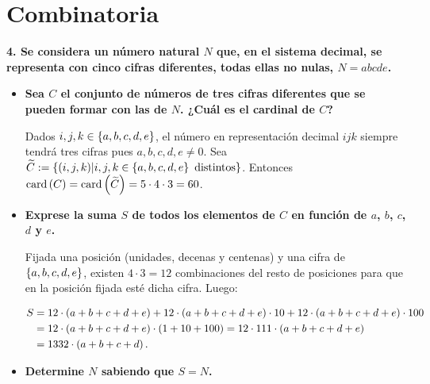 \chapter{Combinatoria}

\textbf{4. Se considera un número natural $N$ que, en el sistema decimal, se representa con cinco cifras diferentes, todas ellas no nulas, $N=abcde$.}

  \begin{itemize}
    \item[\textbf{(1)}] \textbf{Sea $C$ el conjunto de números de tres cifras diferentes que se pueden formar con las de $N$. ¿Cuál es el cardinal de $C$?}
    

    Dados $i,j,k\in\left\{a,b,c,d,e\right\}$, el número en representación decimal $ijk$ siempre tendrá tres cifras pues $a,b,c,d,e\neq 0$. Sea $\widetilde{C}:=\left\{\left(i,j,k\right)\middle|i,j,k\in\left\{a,b,c,d,e\right\}\text{ distintos}\right\}$. Entonces $\text{card}\left(C\right)=\text{card}\left(\widetilde{C}\right)=5\cdot 4\cdot 3=60$.

    \item[\textbf{(2)}] \textbf{Exprese la suma $S$ de todos los elementos de $C$ en función de $a$, $b$, $c$, $d$ y $e$.}
    
    Fijada una posición (unidades, decenas y centenas) y una cifra de $\left\{a,b,c,d,e\right\}$, existen $4\cdot 3=12$ combinaciones del resto de posiciones para que en la posición fijada esté dicha cifra. Luego:

    \begin{equation}
      \begin{split}
        S & =12\cdot\left(a+b+c+d+e\right)+12\cdot\left(a+b+c+d+e\right)\cdot 10+12\cdot\left(a+b+c+d+e\right)\cdot 100\\
        & =12\cdot\left(a+b+c+d+e\right)\cdot\left(1+10+100\right)=12\cdot 111\cdot\left(a+b+c+d+e\right)\\
        & =1332\cdot\left(a+b+c+d\right).
      \end{split}
    \end{equation}

    \item[\textbf{\text{(3)}}] \textbf{Determine $N$ sabiendo que $S=N$.}
  \end{itemize}